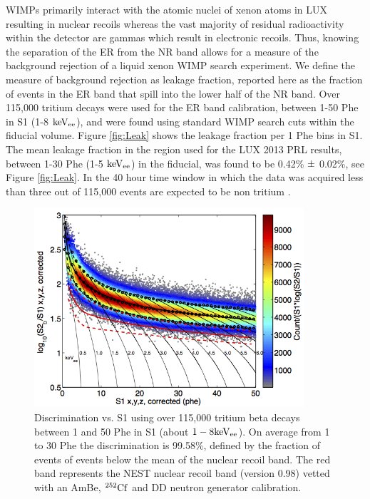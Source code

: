 WIMPs primarily interact with the atomic nuclei of xenon atoms in LUX resulting in nuclear recoils whereas the vast majority of residual radioactivity within the detector are gammas which result in electronic recoils. Thus, knowing the separation of the ER from the NR band allows for a measure of the background rejection of a liquid xenon WIMP search experiment. We define the measure of background rejection as leakage fraction, reported here as the fraction of events in the ER band that spill into the lower half of the NR band. Over 115,000 tritium decays were used for the ER band calibration, between 1-50 Phe in S1 (1-8 $\rm keV_{ee}$), and were found using standard WIMP search cuts within the fiducial volume. 
Figure \ref{fig:Leak} shows the leakage fraction per 1 Phe bins in S1. The mean leakage fraction in the region used for the LUX 2013 PRL results, between 1-30 Phe (1-5 $\rm keV_{ee}$) in the fiducial, was found to be 0.42\% $\rm \pm$ 0.02\%, see Figure \ref{fig:Leak}. In the 40 hour time window in which the data was acquired less than three out of 115,000 events are expected to be non tritium \cite{LUX_BG}. 


\begin{figure}[h!]\centering
\includegraphics[width=100mm]{CH3T_fid_50_2_Dec_Tritium_Approval_Plots.png}
\caption{Discrimination vs. S1 using over 115,000 tritium beta decays between 1 and 50 Phe in S1 (about $\rm1-8 keV_{ee}$). On average from 1 to 30 Phe the discrimination is 99.58\%, defined by the fraction of events of events below the mean of the nuclear recoil band. The red band represents the NEST nuclear recoil band (version 0.98) vetted with an AmBe, $\rm^{252}Cf$ and DD neutron generator calibration.}
\label{fig:Band}
\end{figure}

